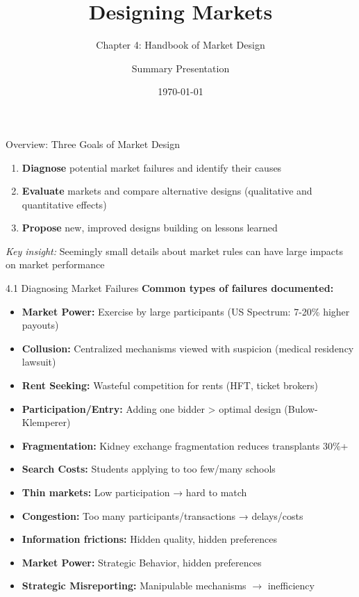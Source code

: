 \documentclass{beamer}
\title{Designing Markets}
\subtitle{Chapter 4: Handbook of Market Design}
\author{Summary Presentation}
\date{\today}
\begin{document}
\frame{\titlepage}

\begin{frame}{Overview: Three Goals of Market Design}
\begin{enumerate}
    \item \textbf{Diagnose} potential market failures and identify their causes
    \item \textbf{Evaluate} markets and compare alternative designs (qualitative and quantitative effects)
    \item \textbf{Propose} new, improved designs building on lessons learned
\end{enumerate}

\vspace{0.5cm}
\textit{Key insight:} Seemingly small details about market rules can have large impacts on market performance
\end{frame}

\begin{frame}{4.1 Diagnosing Market Failures}
\textbf{Common types of failures documented:}
\begin{itemize}
    \item \textbf{Market Power:} Exercise by large participants (US Spectrum: 7-20\% higher payouts)
    \item \textbf{Collusion:} Centralized mechanisms viewed with suspicion (medical residency lawsuit)
    \item \textbf{Rent Seeking:} Wasteful competition for rents (HFT, ticket brokers)
    \item \textbf{Participation/Entry:} Adding one bidder > optimal design (Bulow-Klemperer)
    \item \textbf{Fragmentation:} Kidney exchange fragmentation reduces transplants 30\%+
    \item \textbf{Search Costs:} Students applying to too few/many schools
    \item \textbf{Thin markets:} Low participation → hard to match
    \item \textbf{Congestion:} Too many participants/transactions → delays/costs
    \item \textbf{Information frictions:} Hidden quality, hidden preferences
    \item \textbf{Market Power:} Strategic Behavior, hidden preferences
    \item \textbf{Strategic Misreporting:} Manipulable mechanisms $\rightarrow$ inefficiency
\end{itemize}
\end{frame}
\end{document}
